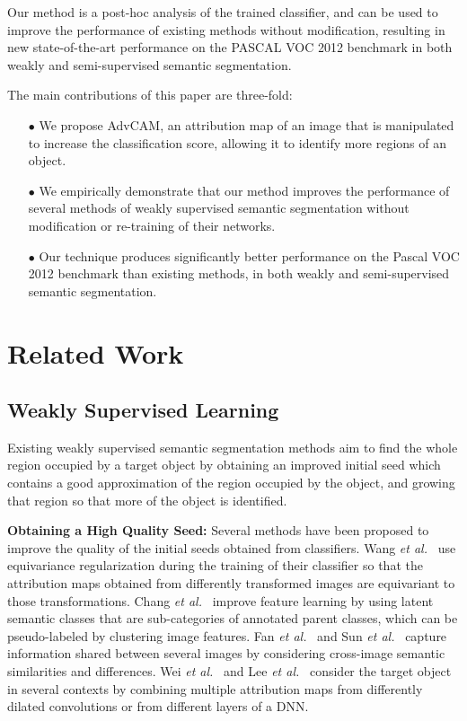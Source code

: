 \documentclass[final]{cvpr}
\begin{document}
Our method is a post-hoc analysis of the trained classifier, and can be used to improve the performance of existing methods without modification, resulting in new state-of-the-art performance on the PASCAL VOC 2012 benchmark in both weakly and semi-supervised semantic segmentation.

The main contributions of this paper are three-fold:
\begin{itemize}
\vspace{-5pt}
	\item[$\bullet$] We propose AdvCAM, an attribution map of an image that is manipulated to increase the classification score, allowing it to identify more regions of an object.
	\vspace{-5pt}
	\item[$\bullet$] We empirically demonstrate that our method improves the performance of several methods of weakly supervised semantic segmentation without modification or re-training of their networks.
	\vspace{-5pt}
	\item[$\bullet$] Our technique produces significantly better performance on the Pascal VOC 2012 benchmark than existing methods, in both weakly and semi-supervised semantic segmentation.
\vspace{-3pt}
\end{itemize}


\section{Related Work}
\subsection{Weakly Supervised Learning}\label{re_weak}
Existing weakly supervised semantic segmentation methods aim to find the whole region occupied by a target object by obtaining an improved initial seed which contains a good approximation of the region occupied by the object, and growing that region so that more of the object is identified.

\textbf{Obtaining a High Quality Seed:}
Several methods have been proposed to improve the quality of the initial seeds obtained from classifiers. 
Wang \textit{et al.}~\cite{wang2020self} use equivariance regularization during the training of their classifier so that the attribution maps obtained from differently transformed images are equivariant to those transformations.
Chang \textit{et al.}~\cite{chang2020weakly} improve feature learning by using latent semantic classes that are sub-categories of annotated parent classes, which can be pseudo-labeled by clustering image features.
Fan \textit{et al.}~\cite{fan2018cian} and Sun \textit{et al.}~\cite{sun2020mining} capture information shared between several images by considering cross-image semantic similarities and differences. 
Wei \textit{et al.}~\cite{wei2018revisiting} and Lee \textit{et al.}~\cite{lee2018robust} consider the target object in several contexts by combining multiple attribution maps from differently dilated convolutions or from different layers of a DNN.
\end{document}
